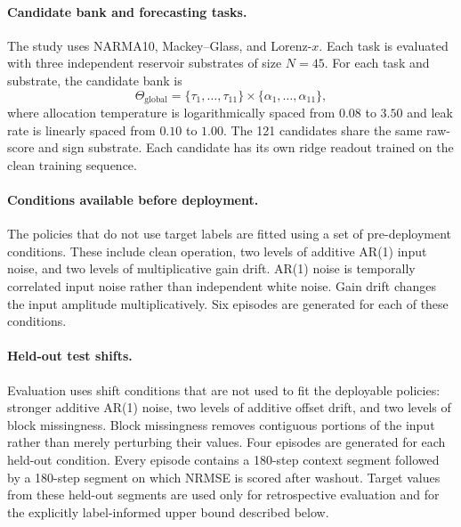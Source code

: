 \documentclass[11pt,a4paper]{article}
\begin{document}
\paragraph{Candidate bank and forecasting tasks.}
The study uses NARMA10, Mackey--Glass, and Lorenz-$x$. Each task is evaluated with three independent reservoir substrates of size $N=45$. For each task and substrate, the candidate bank is
\begin{equation}
  \Theta_{\mathrm{global}}
  =\{\tau_1,\ldots,\tau_{11}\}\times\{\alpha_1,\ldots,\alpha_{11}\},
\end{equation}
where allocation temperature is logarithmically spaced from $0.08$ to $3.50$ and leak rate is linearly spaced from $0.10$ to $1.00$. The 121 candidates share the same raw-score and sign substrate. Each candidate has its own ridge readout trained on the clean training sequence.

\paragraph{Conditions available before deployment.}
The policies that do not use target labels are fitted using a set of pre-deployment conditions. These include clean operation, two levels of additive AR(1) input noise, and two levels of multiplicative gain drift. AR(1) noise is temporally correlated input noise rather than independent white noise. Gain drift changes the input amplitude multiplicatively. Six episodes are generated for each of these conditions.

\paragraph{Held-out test shifts.}
Evaluation uses shift conditions that are not used to fit the deployable policies: stronger additive AR(1) noise, two levels of additive offset drift, and two levels of block missingness. Block missingness removes contiguous portions of the input rather than merely perturbing their values. Four episodes are generated for each held-out condition. Every episode contains a 180-step context segment followed by a 180-step segment on which NRMSE is scored after washout. Target values from these held-out segments are used only for retrospective evaluation and for the explicitly label-informed upper bound described below.
\end{document}
